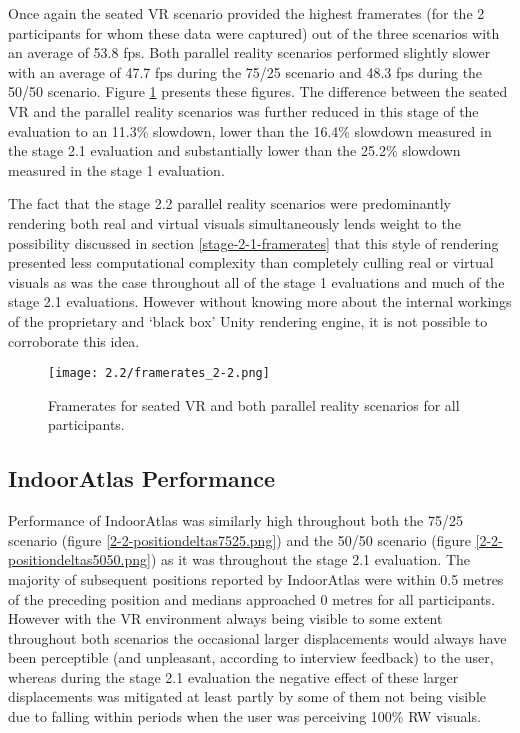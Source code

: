 Once again the seated VR scenario provided the highest framerates (for the 2 participants for whom these data were captured) out of the three scenarios with an average of 53.8 fps. Both parallel reality scenarios performed slightly slower with an average of 47.7 fps during the 75/25 scenario and 48.3 fps during the 50/50 scenario. Figure \ref{framerates_2-2.png} presents these figures. The difference between the seated VR and the parallel reality scenarios was further reduced in this stage of the evaluation to an 11.3\% slowdown, lower than the 16.4\% slowdown measured in the stage 2.1 evaluation and substantially lower than the 25.2\% slowdown measured in the stage 1 evaluation.

The fact that the stage 2.2 parallel reality scenarios were predominantly rendering both real and virtual visuals simultaneously lends weight to the possibility discussed in section \ref{stage-2-1-framerates} that this style of rendering presented less computational complexity than completely culling real or virtual visuals as was the case throughout all of the stage 1 evaluations and much of the stage 2.1 evaluations. However without knowing more about the internal workings of the proprietary and `black box' Unity rendering engine, it is not possible to corroborate this idea.

\vspace{2cm}

\begin{figure}[h]
	\begin{center}
	\texttt{[image: 2.2/framerates\_2-2.png]}
	\caption{Framerates for seated VR and both parallel reality scenarios for all participants.}
	\label{framerates_2-2.png}
	\end{center}
\end{figure}


\newpage

\subsection{IndoorAtlas Performance}

Performance of IndoorAtlas was similarly high throughout both the 75/25 scenario (figure \ref{2-2-positiondeltas7525.png}) and the 50/50 scenario (figure \ref{2-2-positiondeltas5050.png}) as it was throughout the stage 2.1 evaluation. The majority of subsequent positions reported by IndoorAtlas were within 0.5 metres of the preceding position and medians approached 0 metres for all participants. However with the VR environment always being visible to some extent throughout both scenarios the occasional larger displacements would always have been perceptible (and unpleasant, according to interview feedback) to the user, whereas during the stage 2.1 evaluation the negative effect of these larger displacements was mitigated at least partly by some of them not being visible due to falling within periods when the user was perceiving 100\% RW visuals.

